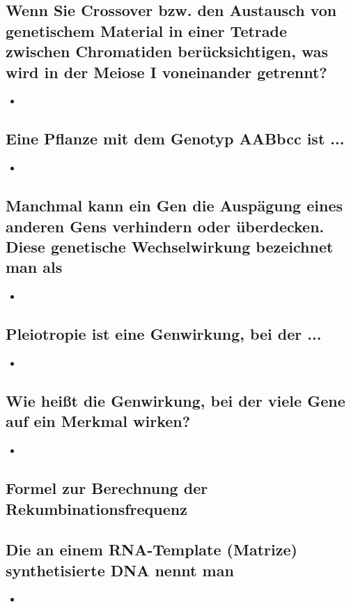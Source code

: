 \documentclass{article}
\begin{document}
\subsection*{Wenn Sie Crossover bzw. den Austausch von genetischem Material in
einer Tetrade zwischen Chromatiden berücksichtigen, was wird in der
Meiose I voneinander getrennt?}
\begin{itemize}
    \item 
\end{itemize}
\subsection*{Eine Pflanze mit dem Genotyp AABbcc ist ...}
\begin{itemize}
    \item 
\end{itemize}
\subsection*{Manchmal kann ein Gen die Auspägung eines anderen Gens verhindern
oder überdecken. Diese genetische Wechselwirkung bezeichnet man als}
\begin{itemize}
    \item 
\end{itemize}


\subsection*{Pleiotropie ist eine Genwirkung, bei der ...}
\begin{itemize}
    \item 
\end{itemize}

\subsection*{Wie heißt die Genwirkung, bei der viele Gene auf ein Merkmal wirken?}
\begin{itemize}
    \item 
\end{itemize}

\subsection*{Formel zur Berechnung der Rekumbinationsfrequenz}

\subsection*{Die an einem RNA-Template (Matrize) synthetisierte DNA nennt man}
\begin{itemize}
    \item 
\end{itemize}
\end{document}
